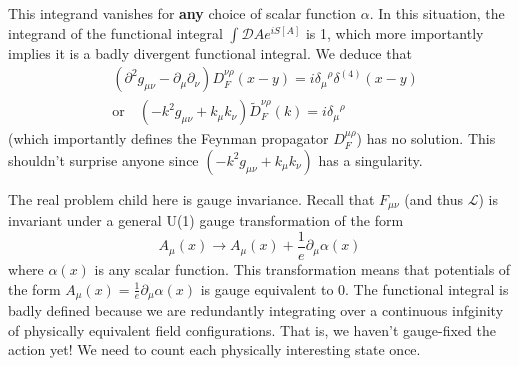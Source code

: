 This integrand vanishes for \textbf{any} choice of scalar
function $\alpha$. In this situation, the integrand of the
functional integral $\int \mathcal{D}A e^{iS[A]}$ is 1, which
more importantly implies it is a badly divergent functional
integral. We deduce that
\begin{equation}\label{eq:photonPropagatorSingularity}
\begin{split}
&(\partial^{2}g_{\mu\nu}-\partial_{\mu}\partial_{\nu})D^{\nu\rho}_{F}(x-y)=i{\delta_{\mu}}^{\rho}\delta^{(4)}(x-y)\\
&\text{or}\quad(-k^{2}g_{\mu\nu}+k_{\mu}k_{\nu})\tilde{D}^{\nu\rho}_{F}(k)=i{\delta_{\mu}}^{\rho}
\end{split}
\end{equation}
(which importantly defines the Feynman propagator
$D^{\mu\rho}_{F}$) has no solution. This shouldn't surprise
anyone since $(-k^{2}g_{\mu\nu}+k_{\mu}k_{\nu})$ has a singularity.

The real problem child here is gauge invariance. Recall that
$F_{\mu\nu}$ (and thus $\mathcal{L}$) is invariant under a
general U(1) gauge transformation of the form
\begin{equation}%
A_{\mu}(x)\to A_{\mu}(x)+\frac{1}{e}\partial_{\mu}\alpha(x)
\end{equation}
where $\alpha(x)$ is any scalar function. This transformation
means that potentials of the form
$A_{\mu}(x)=\frac{1}{e}\partial_{\mu}\alpha(x)$ is gauge
equivalent to 0. The functional integral is badly defined because
we are redundantly integrating over a continuous infginity of
physically equivalent field configurations. That is, we haven't
gauge-fixed the action yet! We need to count each physically
interesting state once.

